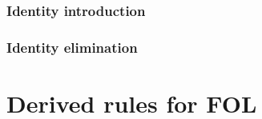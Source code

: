 \bigskip 

\subsubsection*{Identity introduction}

\begin{pf}
	 
\end{pf}


\subsubsection*{Identity elimination}

\begin{multicols}{2}
\begin{pf}
	 
\end{pf}
\begin{pf}
	 
\end{pf}
\end{multicols}


\bigskip 
\section{Derived rules for FOL}
\begin{multicols}{2}
\begin{pf}

\\	
\end{pf}
\begin{pf}

\\	
\end{pf}
\end{multicols}

